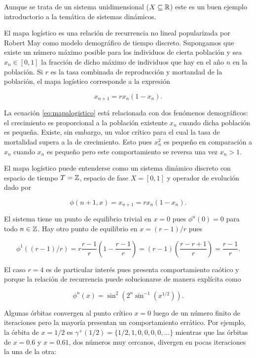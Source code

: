 \begin{example}
Aunque se trata de un sistema unidimensional ($X \subseteq {\ensuremath{\mathbb{R}}}$) este es un buen ejemplo introductorio a la temática de sistemas dinámicos.

El mapa logístico es una relación de recurrencia no lineal popularizada por Robert May \cite{may76} como modelo demográfico de tiempo discreto.
Supongamos que existe un número máximo posible para los individuos de cierta población y sea $x_n \in [0,1]$ la fracción de dicho máximo de individuos que hay en el año $n$ en la población. Si $r$ es la tasa combinada de reproducción y mortandad de la población, el mapa logístico corresponde a la expresión

\begin{equation} \label{eq:mapalogistico}
x_{n+1} = rx_n(1-x_n).
\end{equation}

La ecuación \ref{eq:mapalogistico} está relacionada con dos fenómenos demográficos: el crecimiento es proporcional a la población existente $x_n$ cuando dicha población es pequeña. Existe, sin embargo, un valor crítico para el cual la tasa de mortalidad supera a la de crecimiento.
Esto pues $x_n^2$ es pequeño en comparación a $x_n$ cuando $x_n$ es pequeño pero este comportamiento se reversa una vez $x_n > 1$.

El mapa logístico puede entenderse como un sistema dinámico discreto con espacio de tiempo $T = {\mathbb{Z}}$, espacio de fase $X = [0,1]$ y operador de evolución dado por

\begin{equation} \label{eq:evolucionmapalogistico}
	\phi(n + 1, x) = x_{n+1} = rx_n(1-x_n).
\end{equation}

El sistema tiene un punto de equilibrio trivial en $x = 0$ pues $\phi^n(0) = 0$ para todo $n \in {\ensuremath{\mathbb{Z}}}$. Hay otro punto de equilibrio en $x = (r-1)/r$ pues

$$ \phi^1((r-1)/r) = r \frac{r-1}{r} \left(1 - \frac{r-1}{r} \right) = (r-1) \left( \frac{r - r + 1}{r} \right) = \frac{r-1}{r}. $$

El caso $r = 4$ es de particular interés pues presenta comportamiento caótico \cite[p.~19]{fractallectures} y porque la relación de recurrencia puede solucionarse de manera explícita \cite{lorenz64} como

$$  \phi^n(x) = \sin^2( 2^n \sin^{-1}( x^{1/2} ) ). $$

Algunas órbitas convergen al punto crítico $x = 0$ luego de un número finito de iteraciones pero la mayoría presentan un comportamiento errático. Por ejemplo, la órbita de $x = 1/2$ es $\gamma^+(1/2) = \{ 1/2, 1, 0, 0, 0, 0, ... \}$ mientras que las órbitas de $x = 0.6$ y $x = 0.61$, dos números muy cercanos, divergen en pocas iteraciones la una de la otra:


\end{example}
